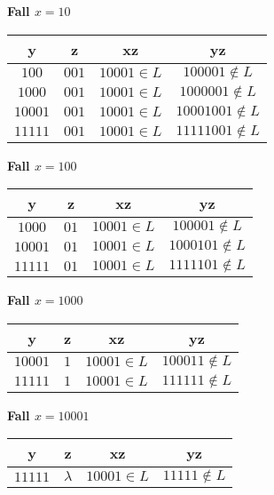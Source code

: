 \textbf{Fall $x= 10$}
\begin{center}

\begin{tabular}[h]{c|c|c|c}
      \textbf{y} & \textbf{z} & \textbf{xz} & \textbf{yz} \\
      \hline
$ 100$ & $001$ & $ 10001 \in L$ & $ 100001 \not\in L$ \\
$ 1000 $ & $001$ & $ 10001 \in L$ & $ 1000 001 \not\in L$ \\
$ 10001$ & $001$ & $ 10001 \in L$ & $ 10001001 \not\in L$ \\
$ 11111$ & $001$ & $ 10001 \in L$ & $ 11111001 \not\in L$
\end{tabular}
\end{center}



\textbf{Fall $x= 100$}
\begin{center}

\begin{tabular}[h]{c|c|c|c}
      \textbf{y} & \textbf{z} & \textbf{xz} & \textbf{yz} \\
      \hline
$ 1000 $ & $01$ & $ 10001 \in L$ & $ 1000 01 \not\in L$ \\
$ 10001$ & $01$ & $ 10001 \in L$ & $ 1000101 \not\in L$ \\
$ 11111$ & $01$ & $ 10001 \in L$ & $ 1111101 \not\in L$
\end{tabular}
\end{center}



\textbf{Fall $x= 1000 $}
\begin{center}

\begin{tabular}[h]{c|c|c|c}
      \textbf{y} & \textbf{z} & \textbf{xz} & \textbf{yz} \\
      \hline
$ 10001$ & $1$ & $ 1000 1 \in L$ & $ 100011 \not\in L$ \\
$ 11111$ & $1$ & $ 1000 1 \in L$ & $ 111111 \not\in L$
\end{tabular}
\end{center}



\textbf{Fall $x= 10001$}
\begin{center}

\begin{tabular}[h]{c|c|c|c}
      \textbf{y} & \textbf{z} & \textbf{xz} & \textbf{yz} \\
      \hline
$ 11111$ & $\lambda$ & $ 10001 \in L$ & $ 11111 \not\in L$
\end{tabular}
\end{center}

